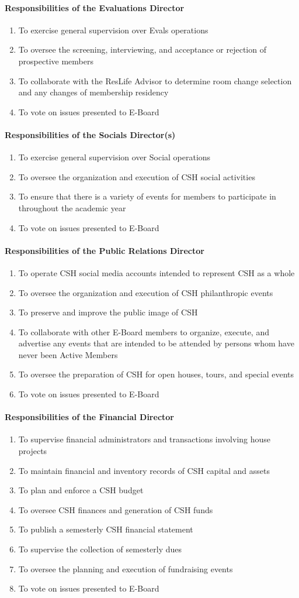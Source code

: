 \documentclass{article}
\newcommand{\asubsubsection}[1]{\paragraph{#1} \label{#1}}
\begin{document}
\asubsubsection{Responsibilities of the Evaluations Director}
\begin{enumerate}
	\item To exercise general supervision over Evals operations
	\item To oversee the screening, interviewing, and acceptance or rejection of prospective members
	\item To collaborate with the ResLife Advisor to determine room change selection and any changes of membership residency
	\item To vote on issues presented to E-Board
\end{enumerate}

\asubsubsection{Responsibilities of the Socials Director(s)}
\begin{enumerate}
	\item To exercise general supervision over Social operations
	\item To oversee the organization and execution of CSH social activities
	\item To ensure that there is a variety of events for members to participate in throughout the academic year
	\item To vote on issues presented to E-Board
\end{enumerate}

\asubsubsection{Responsibilities of the Public Relations Director}
\begin{enumerate}
	\item To operate CSH social media accounts intended to represent CSH as a whole
	\item To oversee the organization and execution of CSH philanthropic events
	\item To preserve and improve the public image of CSH
	\item To collaborate with other E-Board members to organize, execute, and advertise any events that are intended to be attended by persons whom have never been Active Members
	\item To oversee the preparation of CSH for open houses, tours, and special events
	\item To vote on issues presented to E-Board
\end{enumerate}

\asubsubsection{Responsibilities of the Financial Director}
\begin{enumerate}
	\item To supervise financial administrators and transactions involving house projects
	\item To maintain financial and inventory records of CSH capital and assets
	\item To plan and enforce a CSH budget
	\item To oversee CSH finances and generation of CSH funds
	\item To publish a semesterly CSH financial statement
	\item To supervise the collection of semesterly dues
	\item To oversee the planning and execution of fundraising events
	\item To vote on issues presented to E-Board
\end{enumerate}
\end{document}
